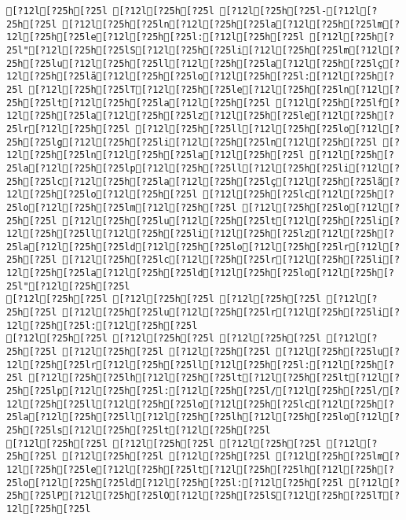 \documentclass{scrartcl}
\begin{document}
\begin{Verbatim}
[?12l[?25h[?25l [?12l[?25h[?25l [?12l[?25h[?25l-[?12l[?25h[?25l [?12l[?25h[?25ln[?12l[?25h[?25la[?12l[?25h[?25lm[?12l[?25h[?25le[?12l[?25h[?25l:[?12l[?25h[?25l [?12l[?25h[?25l"[?12l[?25h[?25lS[?12l[?25h[?25li[?12l[?25h[?25lm[?12l[?25h[?25lu[?12l[?25h[?25ll[?12l[?25h[?25la[?12l[?25h[?25lç[?12l[?25h[?25lã[?12l[?25h[?25lo[?12l[?25h[?25l:[?12l[?25h[?25l [?12l[?25h[?25lT[?12l[?25h[?25le[?12l[?25h[?25ln[?12l[?25h[?25lt[?12l[?25h[?25la[?12l[?25h[?25l [?12l[?25h[?25lf[?12l[?25h[?25la[?12l[?25h[?25lz[?12l[?25h[?25le[?12l[?25h[?25lr[?12l[?25h[?25l [?12l[?25h[?25ll[?12l[?25h[?25lo[?12l[?25h[?25lg[?12l[?25h[?25li[?12l[?25h[?25ln[?12l[?25h[?25l [?12l[?25h[?25ln[?12l[?25h[?25la[?12l[?25h[?25l [?12l[?25h[?25la[?12l[?25h[?25lp[?12l[?25h[?25ll[?12l[?25h[?25li[?12l[?25h[?25lc[?12l[?25h[?25la[?12l[?25h[?25lç[?12l[?25h[?25lã[?12l[?25h[?25lo[?12l[?25h[?25l [?12l[?25h[?25lc[?12l[?25h[?25lo[?12l[?25h[?25lm[?12l[?25h[?25l [?12l[?25h[?25lo[?12l[?25h[?25l [?12l[?25h[?25lu[?12l[?25h[?25lt[?12l[?25h[?25li[?12l[?25h[?25ll[?12l[?25h[?25li[?12l[?25h[?25lz[?12l[?25h[?25la[?12l[?25h[?25ld[?12l[?25h[?25lo[?12l[?25h[?25lr[?12l[?25h[?25l [?12l[?25h[?25lc[?12l[?25h[?25lr[?12l[?25h[?25li[?12l[?25h[?25la[?12l[?25h[?25ld[?12l[?25h[?25lo[?12l[?25h[?25l"[?12l[?25h[?25l
[?12l[?25h[?25l [?12l[?25h[?25l [?12l[?25h[?25l [?12l[?25h[?25l [?12l[?25h[?25lu[?12l[?25h[?25lr[?12l[?25h[?25li[?12l[?25h[?25l:[?12l[?25h[?25l
[?12l[?25h[?25l [?12l[?25h[?25l [?12l[?25h[?25l [?12l[?25h[?25l [?12l[?25h[?25l [?12l[?25h[?25l [?12l[?25h[?25lu[?12l[?25h[?25lr[?12l[?25h[?25ll[?12l[?25h[?25l:[?12l[?25h[?25l [?12l[?25h[?25lh[?12l[?25h[?25lt[?12l[?25h[?25lt[?12l[?25h[?25lp[?12l[?25h[?25l:[?12l[?25h[?25l/[?12l[?25h[?25l/[?12l[?25h[?25ll[?12l[?25h[?25lo[?12l[?25h[?25lc[?12l[?25h[?25la[?12l[?25h[?25ll[?12l[?25h[?25lh[?12l[?25h[?25lo[?12l[?25h[?25ls[?12l[?25h[?25lt[?12l[?25h[?25l
[?12l[?25h[?25l [?12l[?25h[?25l [?12l[?25h[?25l [?12l[?25h[?25l [?12l[?25h[?25l [?12l[?25h[?25l [?12l[?25h[?25lm[?12l[?25h[?25le[?12l[?25h[?25lt[?12l[?25h[?25lh[?12l[?25h[?25lo[?12l[?25h[?25ld[?12l[?25h[?25l:[?12l[?25h[?25l [?12l[?25h[?25lP[?12l[?25h[?25lO[?12l[?25h[?25lS[?12l[?25h[?25lT[?12l[?25h[?25l

\end{Verbatim}
\end{document}
